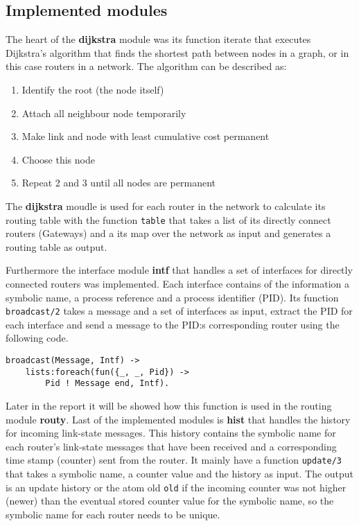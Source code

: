\documentclass[a4paper, 11pt]{article}
\begin{document}
\subsection{Implemented modules}

The heart of the \textbf{dijkstra} module was its function iterate that executes Dijkstra's algorithm that finds the shortest path between nodes in a graph, or in this case routers in a network. The algorithm can be described as:

\begin{enumerate}
\item Identify the root (the node itself)
\item Attach all neighbour node temporarily
\item Make link and node with least cumulative cost permanent
\item Choose this node
\item Repeat 2 and 3 until all nodes are permanent
\end{enumerate}



The \textbf{dijkstra} moudle is used for each router in the network to calculate its routing table with the function \verb!table! that takes a list of its directly connect routers (Gateways) and a its map over the network as input and generates a routing table as output.

Furthermore the interface module \textbf{intf} that handles a set of interfaces for directly connected routers was implemented. Each interface contains of the information a symbolic name, a process reference and a process identifier (PID). Its function \verb!broadcast/2! takes a message and a set of interfaces as input, extract the PID for each interface and send a message to the PID:s corresponding router using the following code.



\begin{verbatim}
broadcast(Message, Intf) ->
    lists:foreach(fun({_, _, Pid}) ->
        Pid ! Message end, Intf).
\end{verbatim}

Later in the report it will be showed how this function is used in the routing module \textbf{routy}. Last of the implemented modules is \textbf{hist} that handles the history for incoming link-state messages. This history contains the symbolic name for each router's link-state messages that have been received and a corresponding time stamp (counter) sent from the router. It mainly have a function \verb!update/3! that takes a symbolic name, a counter value and the history as input. The output is an update history or the atom old \verb!old! if the incoming counter was not higher (newer) than the eventual stored counter value for the symbolic name, so the symbolic name for each router needs to be unique.
\end{document}

